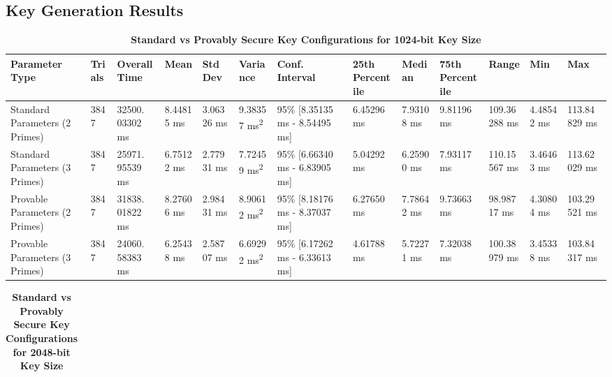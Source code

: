 \documentclass[]{final_report}
\theoremstyle{definition}
\begin{document}
\begin{landscape}
\pagestyle{empty}%

\section{Key Generation Results}

\begin{table}[H]
\caption{\textbf{Standard vs Provably Secure Key Configurations for 1024-bit Key Size}}
\centering

\begin{tabular}{|p{2.5cm}|p{1cm}|p{1.5cm}|p{1.5cm}|p{1.3cm}|p{1.5cm}|p{2.5cm}|p{1.5cm}|p{1.5cm}|p{1.5cm}|p{1.5cm}|p{1.5cm}|p{1.5cm}|}

\hline
\textbf{Parameter Type} & \textbf{Trials} & \textbf{Overall Time} & \textbf{Mean} & \textbf{Std Dev} & \textbf{Variance} & \textbf{Conf. Interval} & \textbf{25th Percentile} & \textbf{Median} & \textbf{75th Percentile} & \textbf{Range} & \textbf{Min} & \textbf{Max} \\
\hline
Standard Parameters (2 Primes) & 3847 & 32500.
03302 ms & 8.44815 ms & 3.06326 ms & 9.38357 ms\textsuperscript{2} & 95\% [8.35135 ms - 8.54495 ms] & 6.45296 ms & 7.93108 ms & 9.81196 ms & 109.36288 ms & 4.48542 ms & 113.84
829 ms \\
\hline
Standard Parameters (3 Primes) & 3847 & 25971.
95539 ms & 6.75122 ms & 2.77931 ms & 7.72459 ms\textsuperscript{2} & 95\% [6.66340 ms - 6.83905 ms] & 5.04292 ms & 6.25900 ms & 7.93117 ms & 110.15567 ms & 3.46463 ms & 113.62
029 ms \\
\hline
Provable Parameters (2 Primes) & 3847 & 31838.
01822 ms & 8.27606 ms & 2.98431 ms & 8.90612 ms\textsuperscript{2} & 95\% [8.18176 ms - 8.37037 ms] & 6.27650 ms & 7.78642 ms & 9.73663 ms & 98.98717 ms & 4.30804 ms & 103.29
521 ms \\
\hline
Provable Parameters (3 Primes) & 3847 & 24060.
58383 ms & 6.25438 ms & 2.58707 ms & 6.69292 ms\textsuperscript{2} & 95\% [6.17262 ms - 6.33613 ms] & 4.61788 ms & 5.72271 ms & 7.32038 ms & 100.38979 ms & 3.45338 ms & 103.84
317 ms \\
\hline
\end{tabular}
    \label{keyGen_1024bit_table}
\end{table}

\begin{table}[H]
\caption{\textbf{Standard vs Provably Secure Key Configurations for 2048-bit Key Size}}
\centering

\begin{tabular}{|p{2.5cm}|p{1cm}|p{1.5cm}|p{1.5cm}|p{1.3cm}|p{1.5cm}|p{2.5cm}|p{1.5cm}|p{1.5cm}|p{1.5cm}|p{1.5cm}|p{1.5cm}|p{1.6cm}|}


\end{tabular}
\end{table}
\end{landscape}
\end{document}
